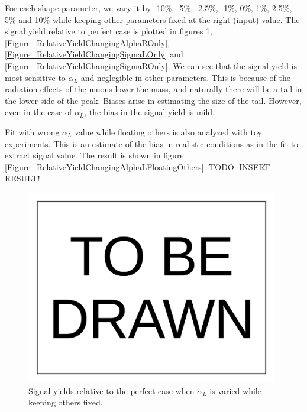 \documentclass[10pt,a4paper,onecolumn]{article}
\begin{document}
For each shape parameter, we vary it by -10\%, -5\%, -2.5\%, -1\%, 0\%, 1\%, 2.5\%, 5\% and 10\% while keeping other parameters fixed at the right (input) value.
The signal yield relative to perfect case is plotted in figures \ref{Figure_RelativeYieldChangingAlphaLOnly}, \ref{Figure_RelativeYieldChangingAlphaROnly},
\ref{Figure_RelativeYieldChangingSigmaLOnly} and \ref{Figure_RelativeYieldChangingSigmaROnly}.
We can see that the signal yield is most sensitive to $\alpha_L$ and neglegible in other parameters.
This is because of the radiation effects of the muons lower the mass, and naturally there will be a tail in the lower side of the peak.
Biases arise in estimating the size of the tail.
However, even in the case of $\alpha_L$, the bias in the signal yield is mild.

Fit with wrong $\alpha_L$ value while floating others is also analyzed with toy experiments.
This is an estimate of the bias in realistic conditions as in the fit to extract signal value.
The result is shown in figure \ref{Figure_RelativeYieldChangingAlphaLFloatingOthers}.
TODO: INSERT RESULT!

\begin{figure}
\includegraphics[width=110mm]{ToBeDrawn.pdf}
\caption{Signal yields relative to the perfect case when $\alpha_L$ is varied while keeping others fixed.}
\label{Figure_RelativeYieldChangingAlphaLOnly}
\end{figure}
\end{document}
